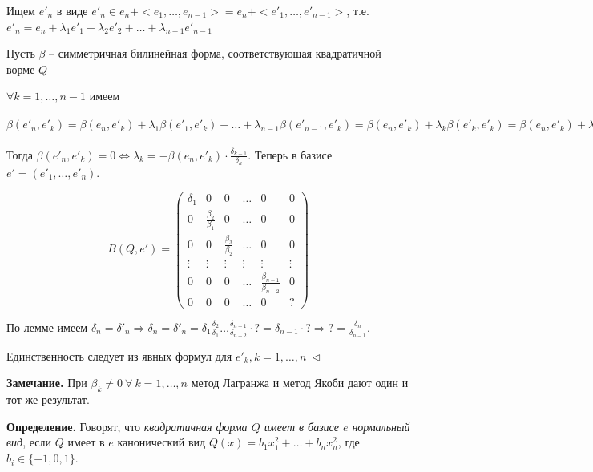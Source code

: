 \vspace{\baselineskip}
Ищем $e'_n$ в виде $e'_n \in e_n + <e_1, \dots, e_{n-1}> = e_n + <e'_1, \dots, e'_{n-1}>$, т.е. $e'_n = e_n + \lambda_1 e'_1 + \lambda_2 e'_2 + \dots + \lambda_{n-1} e'_{n-1}$

Пусть $\beta$ -- симметричная билинейная форма, соответствующая квадратичной ворме $Q$

$\forall k = 1, \dots, n-1$ имеем 

$\beta(e'_n, e'_k) = \beta(e_n, e'_k) + \lambda_1 \beta(e'_1, e'_k) + \dots + \lambda_{n-1} \beta(e'_{n-1}, e'_k) = \beta(e_n, e'_k) + \lambda_k \beta(e'_k, e'_k) =\beta(e_n, e'_k) + \lambda_k \frac{\beta_k}{\beta_{k-1}} $

\vspace{\baselineskip}
Тогда $\beta(e'_n, e'_k) = 0 \Leftrightarrow \lambda_k = -\beta(e_n, e'_k) \cdot \frac{\delta_{k-1}}{\delta_{k}}$. Теперь в базисе $e' = (e'_1, \dots, e'_n)$.

\begin{equation*} B(Q, e') = \begin{pmatrix} \delta_1 & 0 & 0 & \dots & 0 & 0 \\ 0 & \frac{\beta_2}{\beta_1} & 0 & \dots & 0 & 0 \\ 0 & 0 & \frac{\beta_3}{\beta_2} & \dots & 0 & 0 \\ \vdots & \vdots & \vdots & \vdots & \vdots & \vdots \\ 0 & 0 & 0 & \dots & \frac{\beta_{n-1}}{\beta_{n-2}} & 0 \\ 0 & 0 & 0 & \dots & 0 & ? \end{pmatrix}
\end{equation*}

\vspace{\baselineskip}
По лемме имеем $\delta_n = \delta'_n \Rightarrow \delta_n = \delta'_n = \delta_1 \frac{\delta_2}{\delta_1} \dots \frac{\delta_{n-1}}{\delta_{n-2}} \cdot ? = \delta_{n-1} \cdot ? \Rightarrow ? = \frac{\delta_n}{\delta_{n-1}}$.

Единственность следует из явных формул для $e'_k, k = 1, \dots, n \ \lhd$

\vspace{\baselineskip}
\textbf{Замечание.} При $\beta_k \neq 0 \ \forall \ k = 1, \dots, n$ метод Лагранжа и метод Якоби дают один и тот же результат. 

\vspace{\baselineskip}
\textbf{Определение.} Говорят, что \textit{квадратичная форма $Q$ имеет в базисе $e$ нормальный вид}, если $Q$ имеет в $e$ канонический вид $Q(x) = b_1 x_1^2 + \dots + b_n x_n^2$, где $b_i \in \{-1, 0, 1\}$.

